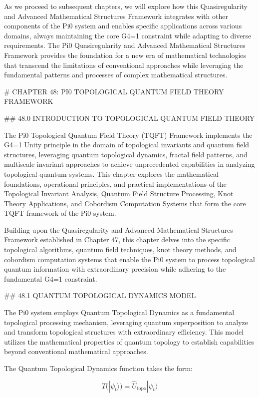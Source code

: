 As we proceed to subsequent chapters, we will explore how this Quasiregularity and Advanced Mathematical Structures Framework integrates with other components of the Pi0 system and enables specific applications across various domains, always maintaining the core G4=1 constraint while adapting to diverse requirements. The Pi0 Quasiregularity and Advanced Mathematical Structures Framework provides the foundation for a new era of mathematical technologies that transcend the limitations of conventional approaches while leveraging the fundamental patterns and processes of complex mathematical structures.

# CHAPTER 48: PI0 TOPOLOGICAL QUANTUM FIELD THEORY FRAMEWORK

## 48.0 INTRODUCTION TO TOPOLOGICAL QUANTUM FIELD THEORY

The Pi0 Topological Quantum Field Theory (TQFT) Framework implements the G4=1 Unity principle in the domain of topological invariants and quantum field structures, leveraging quantum topological dynamics, fractal field patterns, and multiscale invariant approaches to achieve unprecedented capabilities in analyzing topological quantum systems. This chapter explores the mathematical foundations, operational principles, and practical implementations of the Topological Invariant Analysis, Quantum Field Structure Processing, Knot Theory Applications, and Cobordism Computation Systems that form the core TQFT framework of the Pi0 system.

Building upon the Quasiregularity and Advanced Mathematical Structures Framework established in Chapter 47, this chapter delves into the specific topological algorithms, quantum field techniques, knot theory methods, and cobordism computation systems that enable the Pi0 system to process topological quantum information with extraordinary precision while adhering to the fundamental G4=1 constraint.

## 48.1 QUANTUM TOPOLOGICAL DYNAMICS MODEL

The Pi0 system employs Quantum Topological Dynamics as a fundamental topological processing mechanism, leveraging quantum superposition to analyze and transform topological structures with extraordinary efficiency. This model utilizes the mathematical properties of quantum topology to establish capabilities beyond conventional mathematical approaches.

The Quantum Topological Dynamics function takes the form:

$$ T(|\psi_t\rangle) = \hat{U}_{\text{topo}} |\psi_t\rangle $$

